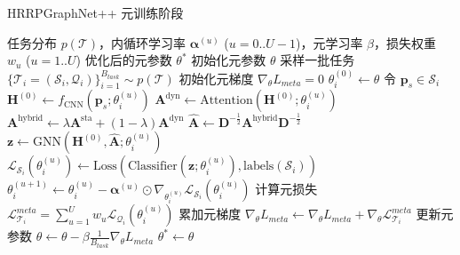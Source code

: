 \begin{algorithm}[htbp] %
\caption{HRRPGraphNet++ 元训练阶段}
\label{alg:meta_training}
\begin{algorithmic}[1] %
    \REQUIRE 任务分布 $p(\mathcal{T})$，内循环学习率 $\boldsymbol{\alpha}^{(u)}$ ($u=0..U-1$)，元学习率 $\beta$，损失权重 $w_u$ ($u=1..U$)
    \ENSURE 优化后的元参数 $\theta^*$
    \STATE 初始化元参数 $\theta$
        \STATE 采样一批任务 $\{\mathcal{T}_i = (\mathcal{S}_i, \mathcal{Q}_i)\}_{i=1}^{B_{task}} \sim p(\mathcal{T})$ %
        \STATE 初始化元梯度 $\nabla_\theta L_{meta} = 0$
            \STATE $\theta_i^{(0)} \leftarrow \theta$
                \STATE 令 $\mathbf{p}_s \in \mathcal{S}_i$
                \STATE $\mathbf{H}^{(0)} \leftarrow f_{\text{CNN}}(\mathbf{p}_s; \theta_i^{(u)})$ %
                \STATE $\mathbf{A}^{\text{dyn}} \leftarrow \text{Attention}(\mathbf{H}^{(0)}; \theta_i^{(u)})$ %
                \STATE $\mathbf{A}^{\text{hybrid}} \leftarrow \lambda \mathbf{A}^{\text{sta}} + (1-\lambda) \mathbf{A}^{\text{dyn}}$
                \STATE $\hat{\mathbf{A}} \leftarrow \mathbf{D}^{-\frac{1}{2}} \mathbf{A}^{\text{hybrid}} \mathbf{D}^{-\frac{1}{2}}$
                \STATE $\mathbf{z} \leftarrow \text{GNN}(\mathbf{H}^{(0)}, \hat{\mathbf{A}}; \theta_i^{(u)})$ %
                \STATE $\mathcal{L}_{\mathcal{S}_i}(\theta_i^{(u)}) \leftarrow \text{Loss}( \text{Classifier}(\mathbf{z}; \theta_i^{(u)}), \text{labels}(\mathcal{S}_i) )$
                \STATE $\theta_i^{(u+1)} \leftarrow \theta_i^{(u)} - \boldsymbol{\alpha}^{(u)} \odot \nabla_{\theta_i^{(u)}} \mathcal{L}_{\mathcal{S}_i}(\theta_i^{(u)})$ %
            \ENDFOR %
            \STATE 计算元损失 $\mathcal{L}_{\mathcal{T}_i}^{meta} = \sum_{u=1}^{U} w_u \mathcal{L}_{\mathcal{Q}_i}(\theta_i^{(u)})$ %
            \STATE 累加元梯度 $\nabla_\theta L_{meta} \leftarrow \nabla_\theta L_{meta} + \nabla_\theta \mathcal{L}_{\mathcal{T}_i}^{meta}$ %
        \ENDFOR %
        \STATE 更新元参数 $\theta \leftarrow \theta - \beta \frac{1}{B_{task}} \nabla_\theta L_{meta}$ %
    \ENDWHILE %
    \STATE $\theta^* \leftarrow \theta$
\end{algorithmic}
\end{algorithm}

